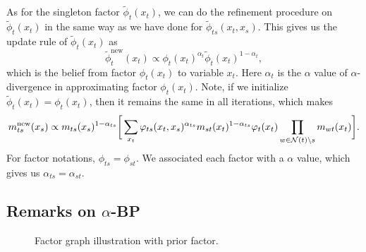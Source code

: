 \documentclass[conference,onecolumn]{IEEEtran}
\begin{document}
As for the singleton factor $\tilde{\phi}_t(x_t)$, we can do the refinement procedure on $\tilde{\phi}_t(x_t)$ in the same way as we have done for $\tilde{\phi}_{ts}(x_t, x_s)$. This gives us the update rule of $\tilde{\phi}_t(x_t)$ as
\begin{equation}\label{eq:fix-factor-update}
  \tilde{\phi}_t^{\mathrm{new}}(x_t) \propto \phi_t(x_t)^{\alpha_{t}} \tilde{\phi}_t(x_t)^{1-\alpha_{t}},
\end{equation}
which is the belief from factor $\phi_t(x_t)$ to variable $x_t$. Here $\alpha_t$ is the $\alpha$ value of $\alpha$-divergence in approximating factor $\phi_t(x_t)$. Note, if
we initialize $\tilde{\phi}_t(x_t) = \phi_t(x_t)$, then it remains the
same in all iterations, which makes
\begin{equation}\label{eq:message-rule}
  {m}^{\text{new}}_{ts}(x_s) \propto  m_{ts}(x_s)^{1-\alpha_{ts}} \bigg[
  \sum_{x_t} \varphi_{ts}(x_t, x_s)^{\alpha_{ts}} {m}_{st}(x_t)^{1-\alpha_{ts}} {\varphi}_t(x_t) \prod_{w\in \mathcal{N}(t)\backslash s}m_{wt}(x_t) \bigg].
\end{equation}
For factor notations, $\phi_{ts}=\phi_{st}$. We associated each factor with a $\alpha$ value, which gives us $\alpha_{ts} = \alpha_{st}$.


\subsection{Remarks on $\alpha$-BP}\label{subsec:remark}
\begin{figure}[!ht]
  \begin{centering}
    \caption{Factor graph illustration with prior factor.}\label{fig:factor-graph-with-prior}
    \vspace{0.1cm}
  \end{centering}
\end{figure}
\end{document}

